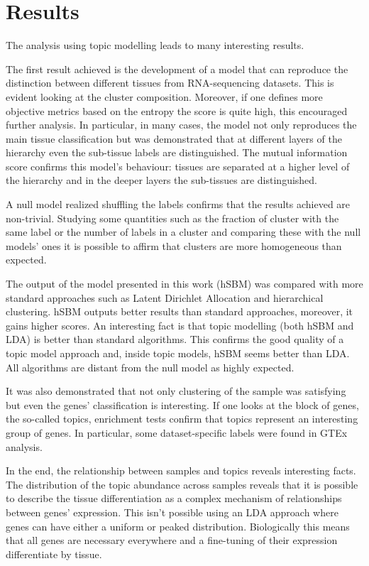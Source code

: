 \section{Results}\label{sec:topic/results}
The analysis using topic modelling leads to many interesting results.

The first result achieved is the development of a model that can reproduce the distinction between different tissues from RNA-sequencing datasets. This is evident looking at the cluster composition. Moreover, if one defines more objective metrics based on the entropy the score is quite high, this encouraged further analysis. In particular, in many cases, the model not only reproduces the main tissue classification but was demonstrated that at different layers of the hierarchy even the sub-tissue labels are distinguished. The mutual information score confirms this model's behaviour: tissues are separated at a higher level of the hierarchy and in the deeper layers the sub-tissues are distinguished.

A null model realized shuffling the labels confirms that the results achieved are non-trivial. Studying some quantities such as the fraction of cluster with the same label or the number of labels in a cluster and comparing these with the null models' ones it is possible to affirm that clusters are more homogeneous than expected.

The output of the model presented in this work (hSBM) was compared with more standard approaches such as Latent Dirichlet Allocation and hierarchical clustering. hSBM outputs better results than standard approaches, moreover, it gains higher scores. An interesting fact is that topic modelling (both hSBM and LDA) is better than standard algorithms. This confirms the good quality of a topic model approach and, inside topic models, hSBM seems better than LDA. All algorithms are distant from the null model as highly expected.

It was also demonstrated that not only clustering of the sample was satisfying but even the genes' classification is interesting. If one looks at the block of genes, the so-called topics, enrichment tests confirm that topics represent an interesting group of genes. In particular, some dataset-specific labels were found in GTEx analysis.

In the end, the relationship between samples and topics reveals interesting facts. The distribution of the topic abundance across samples reveals that it is possible to describe the tissue differentiation as a complex mechanism of relationships between genes' expression. This isn't possible using an LDA approach where genes can have either a uniform or peaked distribution. Biologically this means that all genes are necessary everywhere and a fine-tuning of their expression differentiate by tissue.

